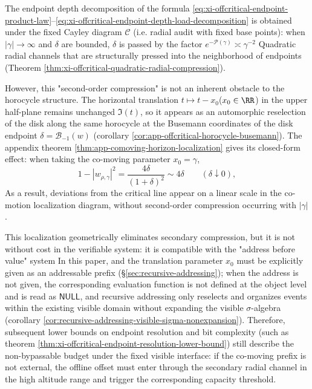 \begin{remark}\label{rem:xi-comoving-horizon-localization-address-null}
The endpoint depth decomposition of the formula \eqref{eq:xi-offcritical-endpoint-product-law}--\eqref{eq:xi-offcritical-endpoint-depth-load-decomposition} is obtained under the fixed Cayley diagram \(\mathcal{C}\) (i.e. radial audit with fixed base points): when \(|\gamma|\to\infty\) and \(\delta\) are bounded, \(\delta\) is passed by the factor \(e^{-\mathcal{P}(\gamma)}\asymp \gamma^{-2}\) Quadratic radial channels that are structurally pressed into the neighborhood of endpoints (Theorem \ref{thm:xi-offcritical-quadratic-radial-compression}).
\par
However, this "second-order compression" is not an inherent obstacle to the horocycle structure.
The horizontal translation \(t\mapsto t-x_0\) ​​(\(x_0\in\RR\)) in the upper half-plane remains unchanged \(\Im(t)\), so it appears as an automorphic reselection of the disk along the same horocycle at the Busemann coordinates of the disk endpoint \(\delta=\mathcal{B}_{-1}(w)\) (corollary \ref{cor:app-offcritical-horocycle-busemann}).
The appendix theorem \ref{thm:app-comoving-horizon-localization} gives its closed-form effect: when taking the co-moving parameter \(x_0=\gamma\),
\[
1-|w_{\rho,\gamma}|^2=\frac{4\delta}{(1+\delta)^2}\sim 4\delta\qquad(\delta\downarrow 0),
\]
As a result, deviations from the critical line appear on a linear scale in the co-motion localization diagram, without second-order compression occurring with \(|\gamma|\).
\par
This localization geometrically eliminates secondary compression, but it is not without cost in the verifiable system: it is compatible with the "address before value" system In this paper, and the translation parameter \(x_0\) must be explicitly given as an addressable prefix (\S\ref{sec:recursive-addressing}); when the address is not given, the corresponding evaluation function is not defined at the object level and is read as \(\mathsf{NULL}\), and recursive addressing only reselects and organizes events within the existing visible domain without expanding the visible \(\sigma\)-algebra (corollary \ref{cor:recursive-addressing-visible-sigma-nonexpansion}).
Therefore, subsequent lower bounds on endpoint resolution and bit complexity (such as theorem \ref{thm:xi-offcritical-endpoint-resolution-lower-bound}) still describe the non-bypassable budget under the fixed visible interface: if the co-moving prefix is ​​not external, the offline offset must enter through the secondary radial channel in the high altitude range and trigger the corresponding capacity threshold.
\end{remark}

